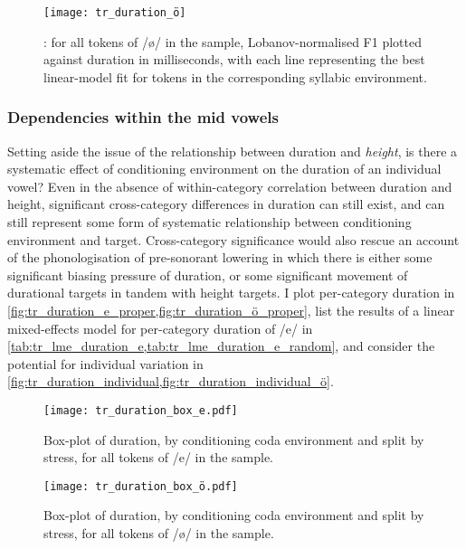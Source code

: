 \begin{figure}[H]
  \centering
  \texttt{[image: tr\_duration\_ö]}
  \caption[ correlation for /ø/, split by environment.]{: for all tokens of /ø/ in the sample, Lobanov-normalised F1 plotted against duration in milliseconds, with each line representing the best linear-model fit for tokens in the corresponding syllabic environment.}
  \label{fig:trdurationö}
\end{figure}

\subsubsection{Dependencies within the mid vowels} Setting aside the issue of the relationship between duration and \emph{height}, is there a systematic effect of conditioning environment on the duration of an individual vowel? Even in the absence of within-category correlation between duration and height, significant cross-category differences in duration can still exist, and can still represent some form of systematic relationship between conditioning environment and target. Cross-category significance would also rescue an account of the phonologisation of pre-sonorant lowering in which there is either some significant biasing pressure of duration, or some significant movement of durational targets in tandem with height targets. I plot per-category duration in \cref{fig:tr_duration_e_proper,fig:tr_duration_ö_proper}, list the results of a linear mixed-effects model for per-category duration of /e/ in \cref{tab:tr_lme_duration_e,tab:tr_lme_duration_e_random}, and consider the potential for individual variation in \cref{fig:tr_duration_individual,fig:tr_duration_individual_ö}.

\begin{figure}[H]
  \texttt{[image: tr\_duration\_box\_e.pdf]}
  \caption[Duration by conditioning category for /e/.]{Box-plot of duration, by conditioning coda environment and split by stress, for all tokens of /e/ in the sample.}
  \label{fig:tr_duration_e_proper}
\end{figure}

\begin{figure}[H]
  \texttt{[image: tr\_duration\_box\_ö.pdf]}
  \caption[Duration by conditioning category for /ø/.]{Box-plot of duration, by conditioning coda environment and split by stress, for all tokens of /ø/ in the sample.}
  \label{fig:tr_duration_ö_proper}
\end{figure}

